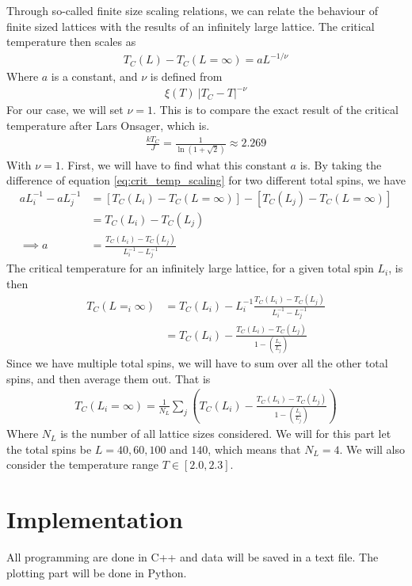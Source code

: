 \documentclass[12pt]{article}
\begin{document}
Through so-called finite size scaling relations, we can relate the behaviour of finite sized lattices with the results of an infinitely large lattice. The critical temperature then scales as
\begin{align}
T_C(L) - T_C(L=\infty) = a L^{-1/\nu}
\label{eq:crit_temp_scaling}
\end{align}
Where $a$ is a constant, and $\nu$ is defined from
\begin{align*}
\xi(T) ~ |T_C - T|^{-\nu}
\end{align*}
For our case, we will set $\nu = 1$. This is to compare the exact result of the critical temperature after Lars Onsager, which is.
\begin{align*}
\frac{kT_C}{J} = \frac{1}{\ln(1 + \sqrt{2})} \approx 2.269
\end{align*}
With $\nu = 1$. First, we will have to find what this constant $a$ is. By taking the difference of equation \ref{eq:crit_temp_scaling} for two different total spins, we have
\begin{align*}
aL_i^{-1} - aL_j^{-1} &= [T_C(L_i) - T_C(L=\infty)] - [T_C(L_j) - T_C(L = \infty)] \\
&= T_C(L_i) - T_C(L_j)\\
\implies a &= \frac{T_C(L_i) - T_C(L_j)}{L_i^{-1} - L_j^{-1}}
\end{align*}
The critical temperature for an infinitely large lattice, for a given total spin $L_i$, is then
\begin{align*}
T_C(L=_i\infty) &= T_C(L_i) - L_i^{-1}\frac{T_C(L_i) - T_C(L_j)}{L_i^{-1} - L_j^{-1}} \\
&= T_C(L_i) - \frac{T_C(L_i) - T_C(L_j)}{1 - \left(\frac{L_i}{L_j} \right)}
\end{align*}
Since we have multiple total spins, we will have to sum over all the other total spins, and then average them out. That is
\begin{align*}
T_C(L_i=\infty) = \frac{1}{N_L} \displaystyle \sum_j \left( T_C(L_i) - \frac{T_C(L_i) - T_C(L_j)}{1 - \left(\frac{L_i}{L_j} \right)} \right)
\end{align*}
Where $N_L$ is the number of all lattice sizes considered. We will for this part let the total spins be $L=40, 60, 100$ and $140$, which means that $N_L = 4$. We will also consider the temperature range $T \in [2.0, 2.3]$.

\section{Implementation} \label{section:implement}
All programming are done in C++ and data will be saved in a text file. The plotting part will be done in Python.
\end{document}
